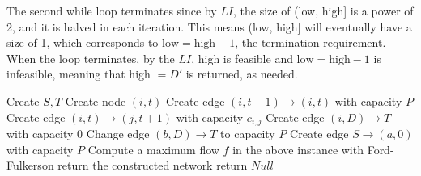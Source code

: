 \documentclass[11pt]{article}
\begin{document}
The second while loop terminates since by $LI$, the size of (low, high] is a power of 2, and it is halved in each iteration. This means (low, high] will eventually have a size of 1, which corresponds to $\text{low}=\text{high}-1$, the termination requirement. When the loop terminates, by the $LI$, high is feasible and $\text{low}=\text{high}-1$ is infeasible, meaning that high $=D'$ is returned, as needed.


\begin{algorithm}[H]
\caption{Helper function to create the network}
\begin{algorithmic}[1]
\State Create $S,T$
\State Create node $(i,t)$
 \State Create edge $(i,t-1)\to(i,t)$ with capacity $P$
\EndIf
\EndFor
\EndFor
{}
\State Create edge $(i,t)\to(j,t+1)$ with capacity $c_{i,j}$
\EndFor
\EndFor
{}
\State Create edge $(i,D)\to T$ with capacity 0
\EndFor
\State Change edge $(b,D)\to T$ to capacity $P$
\State Create edge $S\to(a,0)$ with capacity $P$
\State Compute a maximum flow $f$ in the above instance with Ford-Fulkerson
 \State return the constructed network
\Else \State return $Null$ 
\EndIf
\EndFunction
\end{algorithmic}
\end{algorithm}
\end{document}
